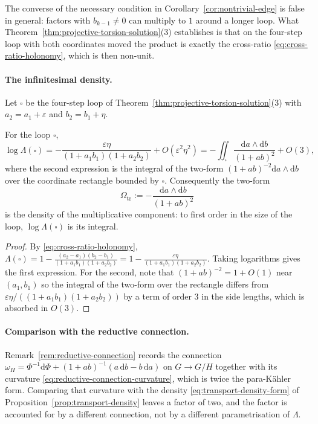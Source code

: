The converse of the necessary condition in
Corollary~\ref{cor:nontrivial-edge} is false in general: factors with
$b_{k-1}\ne0$ can multiply to $1$ around a longer loop.  What
Theorem~\ref{thm:projective-torsion-solution}(3) establishes is that on the
four-step loop with both coordinates moved the product is exactly the
cross-ratio \eqref{eq:cross-ratio-holonomy}, which is then non-unit.

\paragraph{The infinitesimal density.}
Let $\square$ be the four-step loop of
Theorem~\ref{thm:projective-torsion-solution}(3) with
$a_2=a_1+\varepsilon$ and $b_2=b_1+\eta$.

\begin{proposition}
\label{prop:transport-density}
For the loop $\square$,
\begin{equation}\label{eq:log-holonomy}
  \log\Lambda(\square)
  =-\frac{\varepsilon\eta}{(1+a_1b_1)(1+a_2b_2)}+O(\varepsilon^2\eta^2)
  =-\iint_{\square}\frac{\mathrm da\wedge\mathrm db}{(1+ab)^{2}}+O(3),
\end{equation}
where the second expression is the integral of the two-form
$(1+ab)^{-2}\mathrm da\wedge\mathrm db$ over the coordinate rectangle bounded by
$\square$.  Consequently the two-form
\begin{equation}\label{eq:transport-density-form}
  \Omega_{\mathrm{tr}}:=-\frac{\mathrm da\wedge\mathrm db}{(1+ab)^{2}}
\end{equation}
is the density of the multiplicative component: to first order in the size of
the loop, $\log\Lambda(\square)$ is its integral.
\end{proposition}

\begin{proof}
By \eqref{eq:cross-ratio-holonomy},
$\Lambda(\square)=1-\frac{(a_2-a_1)(b_2-b_1)}{(1+a_1b_1)(1+a_2b_2)}
=1-\frac{\varepsilon\eta}{(1+a_1b_1)(1+a_2b_2)}$.  Taking logarithms gives the
first expression.  For the second, note that
$(1+ab)^{-2}=1+O(1)$ near $(a_1,b_1)$ so the integral of the two-form over the
rectangle differs from $\varepsilon\eta/((1+a_1b_1)(1+a_2b_2))$ by a term of
order $3$ in the side lengths, which is absorbed in $O(3)$.
\end{proof}

\paragraph{Comparison with the reductive connection.}
Remark~\ref{rem:reductive-connection} records the connection
$\omega_H=\Phi^{-1}\mathrm d\Phi+(1+ab)^{-1}(a\,\mathrm db-b\,\mathrm da)$ on
$G\to G/H$ together with its curvature
\eqref{eq:reductive-connection-curvature}, which is twice the para-K\"ahler
form.  Comparing that curvature with the density
\eqref{eq:transport-density-form} of Proposition~\ref{prop:transport-density}
leaves a factor of two, and the factor is accounted for by a different
connection, not by a different parametrisation of $\Lambda$.

